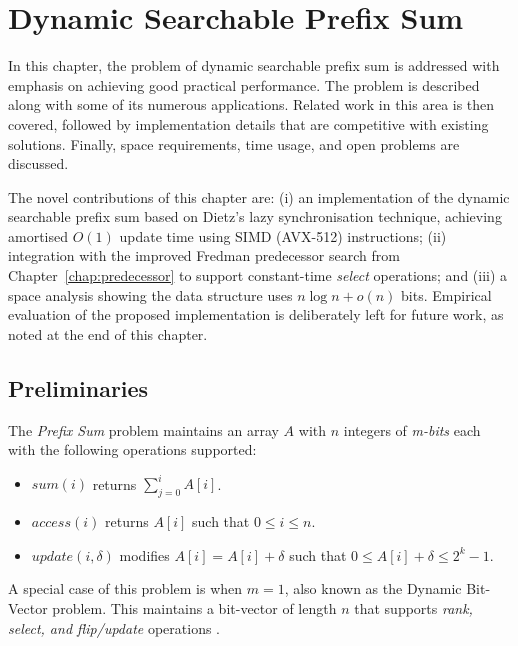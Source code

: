 \chapter{Dynamic Searchable Prefix Sum}
\label{chap:prefixsum}

In this chapter, the problem of dynamic searchable prefix sum is addressed with emphasis on achieving good practical performance. The problem is described along with some of its numerous applications. Related work in this area is then covered, followed by implementation details that are competitive with existing solutions. Finally, space requirements, time usage, and open problems are discussed.

The novel contributions of this chapter are: (i) an implementation of the dynamic searchable prefix sum based on Dietz's lazy synchronisation technique, achieving amortised $O(1)$ update time using SIMD (AVX-512) instructions; (ii) integration with the improved Fredman predecessor search from Chapter~\ref{chap:predecessor} to support constant-time \textit{select} operations; and (iii) a space analysis showing the data structure uses $n \log n + o(n)$ bits. Empirical evaluation of the proposed implementation is deliberately left for future work, as noted at the end of this chapter.
\section{Preliminaries}
The \textit{Prefix Sum} problem maintains an array $A$ with $n$ integers of \textit{m-bits} each with the following operations supported:
\begin{itemize}
    \item $sum(i)$ returns $\sum_{j=0} ^{i} A[i]$.
    \item $access(i)$ returns $A[i]$ such that $0 \leq i \leq n$.
    \item $update(i, \delta)$ modifies $A[i] = A[i] + \delta$ such that $0 \leq A[i] + \delta \leq 2^k - 1$.
\end{itemize}
A special case of this problem is when $m=1$, also known as the Dynamic Bit-Vector problem. This maintains a bit-vector of length $n$ that supports \textit{rank, select, and flip/update} operations \cite{Raman_2001}.

